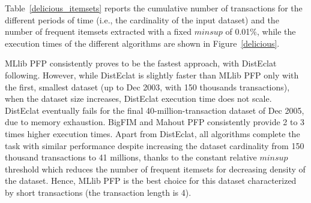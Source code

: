 \documentclass[preprint,review,12pt]{elsarticle}
\begin{document}
Table~\ref{delicious_itemsets} reports the cumulative number of
transactions for the different periods of time
(i.e., the cardinality of the input dataset) and the
number of frequent itemsets extracted with a fixed $minsup$ of 0.01\%,
while the execution times of the
different algorithms are shown in Figure~\ref{delicious}.


MLlib PFP consistently proves to be the fastest approach, with DistEclat following.
However, while DistEclat is slightly faster than MLlib PFP only with the first, smallest dataset
(up to Dec 2003, with 150 thousands transactions), when the dataset size increases,
DistEclat execution time does not scale. DistEclat eventually fails for the final
40-million-transaction dataset of Dec 2005, due to memory exhaustion.
BigFIM and Mahout PFP consistently provide 2 to 3 times higher execution times.
Apart from DistEclat, all algorithms complete the task with similar performance
despite increasing the dataset cardinality from 150 thousand transactions to 41 millions,
thanks to the constant relative $minsup$ threshold
which reduces the number of frequent itemsets
for decreasing density of the dataset.
Hence, MLlib PFP is the best choice for this dataset characterized by short transactions
(the transaction length is 4).
\end{document}
